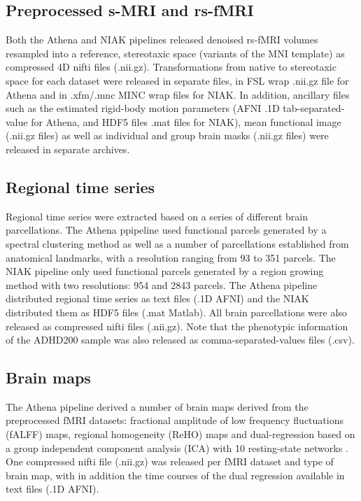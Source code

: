 \documentclass[preprint,12pt,3p]{elsarticle}
\begin{document}
\subsection{Preprocessed s-MRI and rs-fMRI} Both the Athena and NIAK pipelines released denoised rs-fMRI volumes resampled into a reference, stereotaxic space (variants of the MNI template) as compressed 4D nifti files (.nii.gz). Transformations from native to stereotaxic space for each dataset were released in separate files, in FSL wrap .nii.gz file for Athena and in .xfm/.mnc MINC wrap files for NIAK. In addition, ancillary files such as the estimated rigid-body motion parameters (AFNI .1D tab-separated-value for Athena, and HDF5 files .mat files for NIAK), mean functional image (.nii.gz files) as well as individual and group brain masks (.nii.gz files) were released in separate archives. 

\subsection{Regional time series} Regional time series were extracted based on a series of different brain parcellations. The Athena ppipeline used functional parcels generated by a spectral clustering method \cite{craddock2012whole} as well as a number of parcellations established from anatomical landmarks, with a resolution ranging from 93 to 351 parcels. The NIAK pipeline only used functional parcels generated by a region growing method \cite{bellec2006identification} with two resolutions: 954 and 2843 parcels. The Athena pipeline distributed regional time series as text files (.1D AFNI) and the NIAK distributed them as HDF5 files (.mat Matlab). All brain parcellations were also released as compressed nifti files (.nii.gz). Note that the phenotypic information of the ADHD200 sample was also released as comma-separated-values files (.csv). 

\subsection{Brain maps}
The Athena pipeline derived a number of brain maps derived from the preprocessed fMRI datasets: fractional amplitude of low frequency fluctuations (fALFF) maps, regional homogeneity (ReHO) maps and dual-regression based on a group independent component analysis (ICA) with 10 resting-state networks \citep{smith2009correspondence}. One compressed nifti file (.nii.gz) was released per fMRI dataset and type of brain map, with in addition the time courses of the dual regression available in text files (.1D AFNI).
\end{document}
